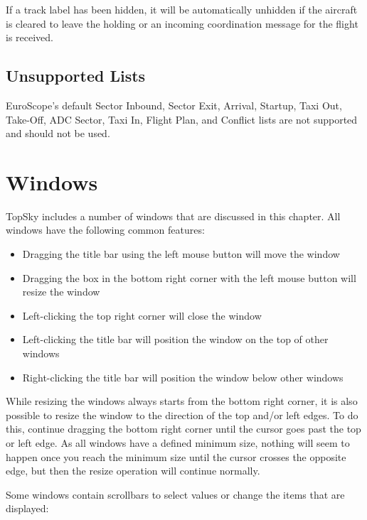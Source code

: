 \documentclass[a4paper,oneside,11pt]{memoir}
\begin{document}
If a track label has been hidden, it will be automatically unhidden if the aircraft is cleared to leave the holding or an incoming coordination message for the flight is received.

\subsection{Unsupported Lists}
\label{list:unsup}

EuroScope's default Sector Inbound, Sector Exit, Arrival, Startup, Taxi Out, Take-Off, ADC Sector, Taxi In, Flight Plan, and Conflict lists are not supported and should not be used.

\section{Windows}
TopSky includes a number of windows that are discussed in this chapter. All windows have the following common features:

\bigskip

\begin{itemize}
    \item Dragging the title bar using the left mouse button will move the window
    \item Dragging the box in the bottom right corner with the left mouse button will resize the window
    \item Left-clicking the top right corner will close the window
    \item Left-clicking the title bar will position the window on the top of other windows
    \item Right-clicking the title bar will position the window below other windows
\end{itemize}

\bigskip

While resizing the windows always starts from the bottom right corner, it is also possible to resize the window to the direction of the top and/or left edges. To do this, continue dragging the bottom right corner until the cursor goes past the top or left edge. As all windows have a defined minimum size, nothing will seem to happen once you reach the minimum size until the cursor crosses the opposite edge, but then the resize operation will continue normally.

\bigskip

Some windows contain scrollbars to select values or change the items that are displayed:

\bigskip
\end{document}
